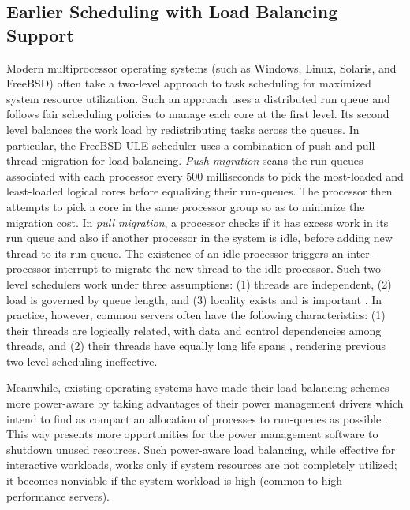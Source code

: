 \documentclass[times, 10pt,twocolumn]{IEEEtran}
\begin{document}
\subsection{Earlier Scheduling with Load Balancing Support}
\label{sec:therm-comp-workl}
Modern multiprocessor operating systems (such as Windows, Linux,
Solaris, and FreeBSD) often take a two-level approach to task scheduling
for maximized system resource utilization.  Such an approach uses a
distributed run queue and follows fair scheduling policies to manage
each core at the first level.  Its second level balances the work load
by redistributing tasks across the queues.  In particular, the FreeBSD
ULE scheduler \cite{Roberson2003,McKusick2004,McKusick2004b} uses a
combination of push and pull thread migration for load balancing.
\textit{Push migration} scans the run queues associated with each
processor every 500 milliseconds to pick the most-loaded and
least-loaded logical cores before equalizing their run-queues.  The
processor then attempts to pick a core in the same processor group so as
to minimize the migration cost.  In \textit{pull migration}, a processor
checks if it has excess work in its run queue and also if another
processor in the system is idle, before adding new thread to its run
queue.  The existence of an idle processor triggers an inter-processor
interrupt to migrate the new thread to the idle processor.  Such
two-level schedulers work under three assumptions: (1) threads are
independent, (2) load is governed by queue length, and (3) locality
exists and is important \cite{Hofmeyr2010}.  In practice, however,
common servers often have the following characteristics: (1) their
threads are logically related, with data and control dependencies among
threads, and (2) their threads have equally long life spans
\cite{Hofmeyr2010}, rendering previous two-level scheduling ineffective.

Meanwhile, existing operating systems have made their load balancing
schemes more power-aware by taking advantages of their power management
drivers which intend to find as compact an allocation of processes to
run-queues as possible \cite{Sun2009,Sun2009b,Xia2010,Sarood2011}.  This
way presents more opportunities for the power management software to
shutdown unused resources.  Such power-aware load balancing, while
effective for interactive workloads, works only if system resources are
not completely utilized; it becomes nonviable if the system workload is
high (common to high-performance servers).
\end{document}
